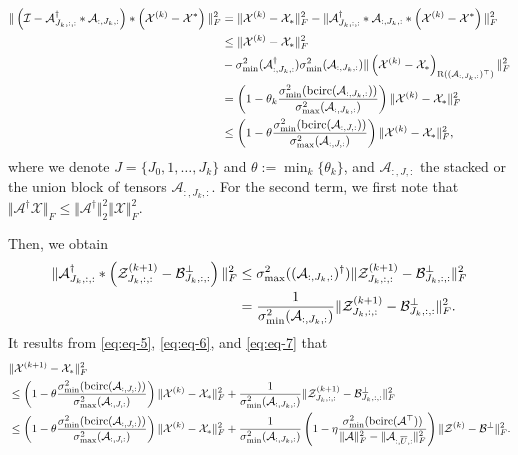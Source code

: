 \documentclass[aspectratio=169]{beamer}
\def\bcirc{{\rm bcirc}}
\def\fm#1{\mathcal{#1}}
\def\m#1{\boldsymbol{#1}}
\def \ai#1{\m A_{I_{#1}, :}}
\def\fm#1{\mathcal{#1}}
\def\m#1{\boldsymbol{#1}}
\def \a#1{\fm A_{:, #1, :}}
\def \ai#1{\fm A_{#1, :, :}}
\def \z#1#2{\fm Z^{(#1)}_{#2, :, :}}
\def \bp#1{\fm B^{\perp}_{#1, :, :}}
\def \x#1{\fm X^{(#1)}}
\begin{document}
\begin{frame}{}
\scriptsize
\begin{align}
\Vert \left( \fm I - \ai{J_k}^\dagger *  \a{J_k} \right) *\left(\x k - \fm X^\ast   \right) \Vert_F^2  & = \Vert \x k - \fm X_\ast \Vert_F^2 - \Vert  \ai{J_k}^\dagger *  \a{J_k}  *\left(\x k - \fm X^\ast   \right) \Vert_F^2  \notag\\
& \leq  \Vert \x k - \fm X_\ast \Vert_F^2  \notag\\
& -\sigma_{\min}^2(\a{J_k}^\dagger) \sigma_{\min}^2(\a{J_k}) \Vert\left( \x{k} - \fm X_\ast \right)_{\text{R}((\a{J_k})^\top)} \Vert_F^2 \notag\\
& = \left( 1 - \theta_k \frac{\sigma_{\min}^2(\bcirc(\a{J_k}))}{\sigma^2_{\max}(\a{J_k})}\right) \Vert \x k - \fm X_\ast \Vert_F^2 \notag  \\
& \leq \left( 1 - \theta \frac{\sigma_{\min}^2(\bcirc(\a{J}))}{\sigma^2_{\max}(\a{J})}\right) \Vert \x k - \fm X_\ast \Vert_F^2 \label{eq:eq-6}, 
\end{align}
where we denote $J = \{J_0, 1, \ldots, J_k \}$ and $\theta:= \min_{k} \{\theta_k \}$, and $\a{J}$ the stacked or the union block of tensors  $\a{J_k}$. For the second term,  we first note that $\Vert \fm A^\dagger \fm X \Vert_F \leq \Vert \fm A ^\dagger \Vert_2^2 \Vert \fm X \Vert_F^2$.
    
\end{frame}
\begin{frame}{}
\scriptsize
Then, we obtain
\begin{align}
  \Vert  \ai{J_k}^\dagger* \left(\z{k+1}{J_k} - \bp{J_k}  \right) \Vert_F^2  & \leq \sigma_{\max}^2((\a{J_k})^\dagger) \Vert  \z{k+1}{J_k} - \bp{J_k} \Vert_F^2 \notag\\
  & = \frac{1}{\sigma_{\min}^2(\a{J_k})} \Vert  \z{k+1}{J_k} - \bp{J_k} \Vert_F^2.
  \label{eq:eq-7}
\end{align}
It results from  \eqref{eq:eq-5}, \eqref{eq:eq-6}, and \eqref{eq:eq-7} that
\begin{align*}
 & \Vert \x{k+1} - \fm X_\ast \Vert_F^2 \\
 &  \leq \left( 1 - \theta \frac{\sigma_{\min}^2(\bcirc(\a{J}))}{\sigma^2_{\max}(\a{J})}\right) \Vert \x k - \fm X_\ast \Vert_F^2 +  \frac{1}{\sigma_{\min}^2(\a{J_k})} \Vert  \z{k+1}{J_k} - \bp{J_k} \Vert_F^2\\
 & \leq \left( 1 - \theta \frac{\sigma_{\min}^2(\bcirc(\a{J}))}{\sigma^2_{\max}(\a{J})}\right) \Vert \x k - \fm X_\ast \Vert_F^2 + \frac{1}{\sigma_{\min}^2(\a{J_k})} \left( 1 - \eta  \frac{\sigma_{\min}^2(\bcirc(\fm A^\top))}{\Vert \fm A \Vert_F^2 - \Vert \a{\overline{U}} \Vert_F^2}   \right) \Vert  \fm Z^{(k)} - \fm B^\perp \Vert_F^2 .
\end{align*}
\end{frame}
\end{document}
